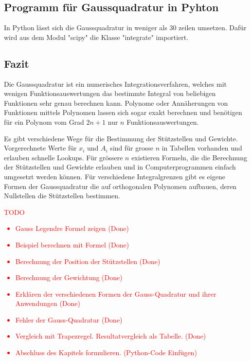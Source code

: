 \subsection{Programm für Gaussquadratur in Pyhton}
In Python lässt sich die Gaussquadratur in weniger als $30$ zeilen umsetzen.
Dafür wird aus dem Modul "scipy" die Klasse "integrate" importiert. 


\subsection{Fazit}
Die Gaussquadratur ist ein numerisches Integrationsverfahren, welches
mit wenigen Funktionsauswertungen das bestimmte Integral von beliebigen
Funktionen sehr genau berechnen kann. 
Polynome oder Annäherungen von Funktionen mittels Polynomen lassen sich 
sogar exakt berechnen und benötigen für ein Polynom vom Grad $2n+1$ nur 
$n$ Funktionsauswertungen.

Es gibt verschiedene Wege für die Bestimmung der Stützstellen und Gewichte.
Vorgerechnete Werte für $x_{i}$ und $A_{i}$ sind für grosse $n$ in Tabellen
vorhanden und erlauben schnelle Lookups. Für grössere $n$ existieren
Formeln, die die Berechnung der Stützstellen und Gewichte erlauben und
in Computerprogrammen einfach umgesetzt werden können.
Für verschiedene Integralgrenzen gibt es eigene Formen der Gaussquadratur
die auf orthogonalen Polynomen aufbauen, deren Nullstellen die Stützstellen
bestimmen.
\textcolor{red}{
    TODO
    \begin{itemize}
        \item Gauss Legendre Formel zeigen (Done)
        \item Beispiel berechnen mit Formel (Done)
        \item Berechnung der Position der Stützstellen (Done)
        \item Berechnung der Gewichtung (Done)
        \item Erklären der verschiedenen Formen der Gauss-Quadratur und ihrer Anwendungen (Done)
        \item Fehler der Gauss-Quadratur (Done)
        \item Vergleich mit Trapezregel. Resultatvergleich als Tabelle. (Done)
        \item Abschluss des Kapitels formulieren. (Python-Code Einfügen)
    \end{itemize}
}






